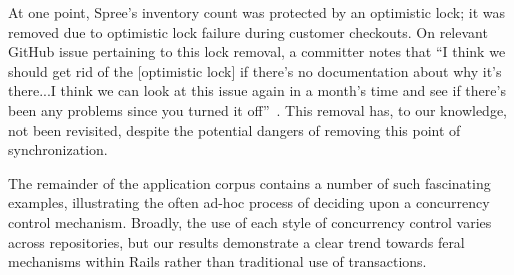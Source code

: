 At one point, Spree's inventory count was protected by an optimistic
lock; it was removed due to optimistic lock failure during customer
checkouts. On relevant GitHub issue pertaining to this lock removal, a
committer notes that ``I think we should get rid of the [optimistic
lock] if there's no documentation about why it's there...I think we
can look at this issue again in a month's time and see if there's been
any problems since you turned it
off''~\cite{code-optimistic-issue}. This removal has, to our
knowledge, not been revisited, despite the potential dangers of
removing this point of synchronization.

The remainder of the application corpus contains a number of such
fascinating examples, illustrating the often ad-hoc process of
deciding upon a concurrency control mechanism. Broadly, the use of
each style of concurrency control varies across repositories, but our
results demonstrate a clear trend towards feral mechanisms within
Rails rather than traditional use of transactions.

